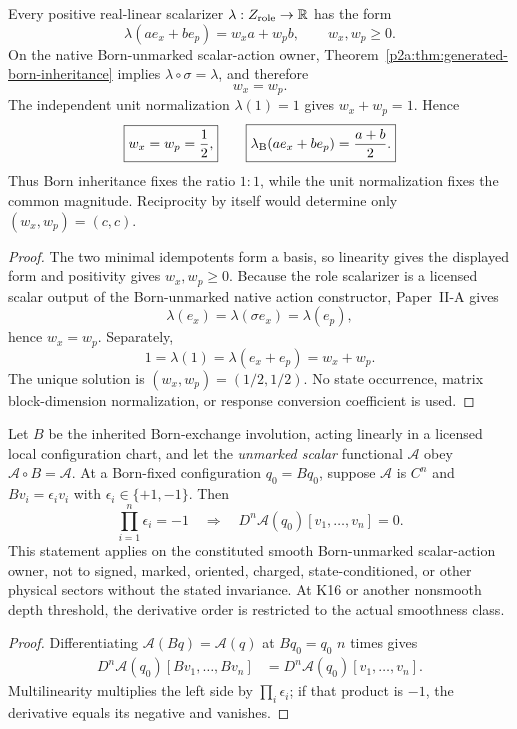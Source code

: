 \documentclass[12pt,a4paper]{article}
\begin{document}
\begin{lemma}
\label{p3b:lem:equal-born-role-weights}
Every positive real-linear scalarizer
\(\lambda:Z_{\rm role}\to\mathbb R\) has the form
\[
 \lambda(ae_x+be_p)=w_xa+w_pb,
 \qquad w_x,w_p\ge0.
\]
On the native Born-unmarked scalar-action owner,
Theorem~\ref{p2a:thm:generated-born-inheritance} implies
\(\lambda\circ\sigma=\lambda\), and therefore
\[
 w_x=w_p.
\]
The independent unit normalization \(\lambda(1)=1\) gives
\(w_x+w_p=1\).  Hence
\[
 \boxed{w_x=w_p=\frac12,}
 \qquad
 \boxed{\lambda_{\rm B}(ae_x+be_p)=\frac{a+b}{2}.}
\]
Thus Born inheritance fixes the ratio \(1:1\), while the unit normalization
fixes the common magnitude.  Reciprocity by itself would determine only
\((w_x,w_p)=(c,c)\).
\end{lemma}

\begin{proof}
The two minimal idempotents form a basis, so linearity gives the displayed
form and positivity gives \(w_x,w_p\ge0\).  Because the role scalarizer is a
licensed scalar output of the Born-unmarked native action constructor,
Paper~II-A gives
\[
 \lambda(e_x)=\lambda(\sigma e_x)=\lambda(e_p),
\]
hence \(w_x=w_p\).  Separately,
\[
 1=\lambda(1)=\lambda(e_x+e_p)=w_x+w_p.
\]
The unique solution is \((w_x,w_p)=(1/2,1/2)\).  No state occurrence, matrix
block-dimension normalization, or response conversion coefficient is used.
\end{proof}

\begin{corollary}
\label{p3b:cor:v1100-born-involution-derivative-selection}
Let $B$ be the inherited Born-exchange involution, acting linearly in a
licensed local configuration chart, and let the \emph{unmarked scalar}
functional $\mathcal A$ obey $\mathcal A\circ B=\mathcal A$. At a
Born-fixed configuration $q_0=Bq_0$, suppose $\mathcal A$ is $C^n$ and
$Bv_i=\epsilon_i v_i$ with $\epsilon_i\in\{+1,-1\}$. Then
\[
 \boxed{\prod_{i=1}^{n}\epsilon_i=-1
 \quad\Longrightarrow\quad
 D^n\mathcal A(q_0)[v_1,\ldots,v_n]=0.}
\]
This statement applies on the constituted smooth Born-unmarked
scalar-action owner, not to signed, marked, oriented, charged,
state-conditioned, or other physical sectors without the stated
invariance. At K16 or another nonsmooth depth threshold, the derivative
order is restricted to the actual smoothness class.
\end{corollary}
\begin{proof}
Differentiating $\mathcal A(Bq)=\mathcal A(q)$ at $Bq_0=q_0$
$n$ times gives
\[
\begin{aligned}
 D^n\mathcal A(q_0)[Bv_1,\ldots,Bv_n]
 &=D^n\mathcal A(q_0)[v_1,\ldots,v_n].
\end{aligned}
\]
Multilinearity multiplies the left side by $\prod_i\epsilon_i$;
if that product is $-1$, the derivative equals its negative and
vanishes.
\end{proof}
\end{document}
